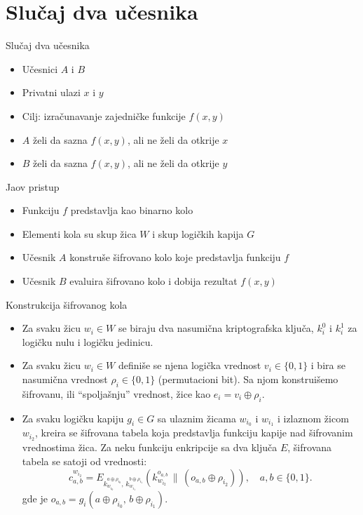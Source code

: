 \documentclass[aspectratio=1610]{beamer}
\begin{document}
\section{Slučaj dva učesnika}
\begin{frame}{Slučaj dva učesnika}
\begin{itemize}
    \item Učesnici $A$ i $B$
    \item Privatni ulazi $x$ i $y$
    \item Cilj: izračunavanje zajedničke funkcije $f(x,y)$
    \item $A$ želi da sazna $f(x,y)$, ali ne želi da otkrije $x$
    \item $B$ želi da sazna $f(x,y)$, ali ne želi da otkrije $y$
\end{itemize}
\end{frame}

\begin{frame}{Jaov pristup}
\begin{itemize}
    \item Funkciju $f$ predstavlja kao binarno kolo
    \item Elementi kola su skup žica $W$ i skup logičkih kapija $G$
    \item Učesnik $A$ konstruše šifrovano kolo koje predstavlja funkciju $f$
    \item Učesnik $B$ evaluira šifrovano kolo i dobija rezultat $f(x,y)$ 
\end{itemize}
\end{frame}

\begin{frame}{Konstrukcija šifrovanog kola}
\begin{itemize}
    \item Za svaku žicu $w_i \in W$ se biraju dva nasumična kriptografska ključa, $k^0_i$ i $k^1_i$ za logičku nulu i logičku jedinicu.
    \item Za svaku žicu $w_i \in W$ definiše se njena logička vrednost $v_i \in \{0,1\}$ i bira se nasumična vrednost $\rho_i \in \{0, 1\}$ (permutacioni bit). Sa njom konstruišemo šifrovanu, ili ``spoljašnju'' vrednost, žice kao $e_i = v_i \oplus \rho_i$.
    \item Za svaku logičku kapiju $g_i \in G$ sa ulaznim žicama $w_{i_0}$ i $w_{i_1}$ i izlaznom žicom $w_{i_2}$, kreira se šifrovana tabela koja predstavlja funkciju kapije nad šifrovanim vrednostima žica. Za neku funkciju enkripcije sa dva ključa $E$, šifrovana tabela se satoji od vrednosti:
    \[
    c_{a,b}^{w_{i_2}} =
    E_{k_{w_{i_0}}^{a \oplus \rho_{i_0}},\,k_{w_{i_1}}^{b \oplus \rho_{i_1}}}
    \!\left(k_{w_{i_2}}^{o_{a,b}} \,\|\, (o_{a,b} \oplus \rho_{i_2})\right),
    \quad
    a,b\in\{0,1\}.
    \]
    gde je $o_{a,b}=g_i(a\oplus \rho_{i_0},\,b\oplus \rho_{i_1})$.
\end{itemize}
\end{frame}
\end{document}
